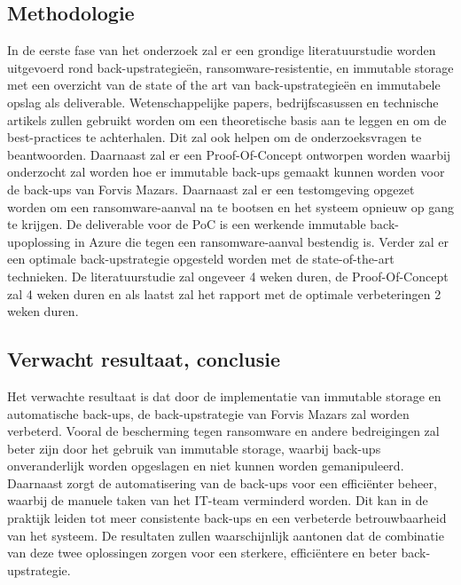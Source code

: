 \subsection{Methodologie}%
\label{sec:methodologie}
In de eerste fase van het onderzoek zal er een grondige literatuurstudie worden uitgevoerd rond back-upstrategieën, ransomware-resistentie, en immutable storage met een overzicht van de state of the art van back-upstrategieën en immutabele opslag als deliverable. Wetenschappelijke papers, bedrijfscasussen en technische artikels zullen gebruikt worden om een theoretische basis aan te leggen en om de best-practices te achterhalen. Dit zal ook helpen om de onderzoeksvragen te beantwoorden. Daarnaast zal er een Proof-Of-Concept ontworpen worden waarbij onderzocht zal worden hoe er immutable back-ups gemaakt kunnen worden voor de back-ups van Forvis Mazars.  Daarnaast zal er een testomgeving opgezet worden om een ransomware-aanval na te bootsen en het systeem opnieuw op gang te krijgen. De deliverable voor de PoC is een werkende immutable back-upoplossing in Azure die tegen een ransomware-aanval bestendig is. Verder zal er een optimale back-upstrategie opgesteld worden met de state-of-the-art technieken. De literatuurstudie zal ongeveer 4 weken duren, de Proof-Of-Concept zal 4 weken duren en als laatst zal het rapport met de optimale verbeteringen 2 weken duren.

\subsection{Verwacht resultaat, conclusie}%
\label{sec:verwachte_resultaten}
Het verwachte resultaat is dat door de implementatie van immutable storage en automatische back-ups, de back-upstrategie van Forvis Mazars zal worden verbeterd. Vooral de bescherming tegen ransomware en andere bedreigingen zal beter zijn door het gebruik van immutable storage, waarbij back-ups onveranderlijk worden opgeslagen en niet kunnen worden gemanipuleerd. Daarnaast zorgt de automatisering van de back-ups voor een efficiënter beheer, waarbij de manuele taken van het IT-team verminderd worden. Dit kan in de praktijk leiden tot meer consistente back-ups en een verbeterde betrouwbaarheid van het systeem. De resultaten zullen waarschijnlijk aantonen dat de combinatie van deze twee oplossingen zorgen voor een sterkere, efficiëntere en beter back-upstrategie.

